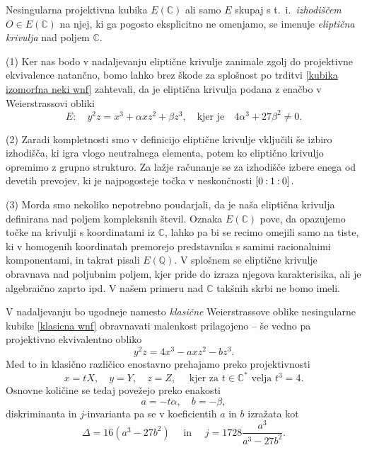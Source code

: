 \documentclass[mat1]{fmfdelo}
\numberwithin{equation}{section}
\newcommand{\C}{\mathbb C}
\newcommand{\CM}{\mathbb C ^*}
\newcommand{\Q}{\mathbb Q}
\newcommand{\pcoor}[1]{%
\begingroup\lccode`~=`: \lowercase{\endgroup
\edef~}{\mathbin{\mathchar\the\mathcode`:}\nobreak}%
\left[%
\begingroup
\mathcode`:=\string"8000
#1%
\endgroup
\right]%
}
\newcommand{\ti}{t.~i.\ }
\theoremstyle{definition}
\begin{document}
\begin{definicija}
    Nesingularna projektivna kubika $E(\C)$ ali samo $E$ skupaj s \ti \emph{izhodiščem} $O \in E(\C)$ na njej, ki ga pogosto eksplicitno ne omenjamo, se imenuje \emph{eliptična krivulja} nad poljem $\C$. 
\end{definicija}

\begin{opomba}
        (1) Ker nas bodo v nadaljevanju eliptične krivulje zanimale zgolj do projektivne ekvivalence natančno, bomo lahko brez škode za splošnost po trditvi \ref{kubika izomorfna neki wnf} zahtevali, da je eliptična krivulja podana z enačbo v Weierstrassovi obliki
        \[
            E: \quad y^2z = x^3 + \alpha x z^2 + \beta z^3,  \quad \text{kjer je} \quad 4\alpha^3 + 27\beta^2 \neq 0.
        \]  
     
        (2) Zaradi kompletnosti smo v definicijo eliptične krivulje vključili še izbiro izhodišča, ki igra vlogo neutralnega elementa, potem ko eliptično krivuljo opremimo z grupno strukturo. Za lažje računanje se za izhodišče izbere enega od devetih prevojev, ki je najpogosteje točka v neskončnosti $\pcoor{0:1:0}$.  

        (3) Morda smo nekoliko nepotrebno poudarjali, da je naša eliptična krivulja definirana nad poljem kompleksnih števil. Oznaka $E(\C)$ pove, da opazujemo točke na krivulji s koordinatami iz $\C$, lahko pa bi se recimo omejili samo na tiste, ki v homogenih koordinatah premorejo predstavnika s samimi racionalnimi komponentami, in takrat pisali $E(\Q)$. V splošnem se eliptične krivulje obravnava nad poljubnim poljem, kjer pride do izraza njegova karakterisika, ali je algebraično zaprto ipd. V našem primeru nad $\C$ takšnih skrbi ne bomo imeli. 
\end{opomba}

V nadaljevanju bo ugodneje namesto \emph{klasične} Weierstrassove oblike nesingularne kubike \eqref{klasicna wnf} obravnavati malenkost prilagojeno -- še vedno pa projektivno ekvivalentno obliko
\[
    y^2z = 4x^3 - axz^2 - bz^3.  
\]
Med to in klasično različico enostavno prehajamo preko projektivnosti
\[
    x = tX, \quad y = Y, \quad z = Z, \quad \text{ kjer za } t \in \CM \text{ velja } t^3 = 4.   
\]
Osnovne količine se tedaj povežejo preko enakosti
\[
    a = -t\alpha, \quad b = -\beta,    
\]
diskriminanta in $j$-invarianta pa se v koeficientih $a$ in $b$ izražata kot
\begin{equation}
    \label{transformacija diskriminante in j-invariante}    
    \Delta = 16(a^3 - 27b^2) \quad \text{ in } \quad j = 1728\frac{a^3}{a^3 - 27b^2}.
\end{equation}
\end{document}
